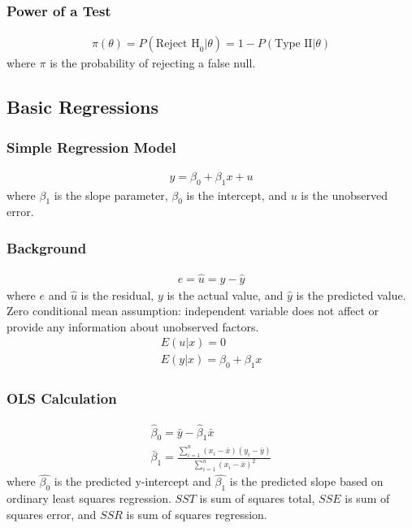 \documentclass[12pt]{article}
\numberwithin{equation}{section}
\begin{document}
\subsubsection{Power of a Test}
\begin{gather}
    \pi(\theta) = P(\text{Reject H}_0|\theta) = 1 - P(\text{Type II}|\theta)
\end{gather}
where $\pi$ is the probability of rejecting a false null.

\subsection{Basic Regressions}


\subsubsection{Simple Regression Model}
\begin{gather}
    y = \beta_0 + \beta_1 x + u
\end{gather}
where $\beta_1$ is the slope parameter, $\beta_0$ is the intercept, and $u$ is the unobserved error.

\subsubsection{Background}
\begin{gather}
    e = \hat{u} = y - \hat{y}
\end{gather}
where $e$ and $\hat{u}$ is the residual, $y$ is the actual value, and $\hat{y}$ is the predicted value. \\[0.5cm]

Zero conditional mean assumption: independent variable does not affect or provide any information about unobserved factors.
\begin{gather}
    E(u|x) = 0 \label{eq:zero_conditional_mean} \\
    E(y|x) = \beta_0 + \beta_1 x
\end{gather}

\subsubsection{OLS Calculation}
\begin{gather}
    \hat{\beta}_0 = \bar{y} - \hat{\beta}_1 \bar{x} \\
    \bar{\beta}_1 = \frac{\sum\limits_{i=1}^{n} (x_i-\bar{x})(y_i-\bar{y})}{\sum\limits_{i=1}^{n} (x_i-\bar{x})^2}
\end{gather}
where $\hat{\beta_0}$ is the predicted y-intercept and $\hat{\beta_1}$ is the predicted slope based on ordinary least squares regression. $SST$ is sum of squares total, $SSE$ is sum of squares error, and $SSR$ is sum of squares regression.
\end{document}
